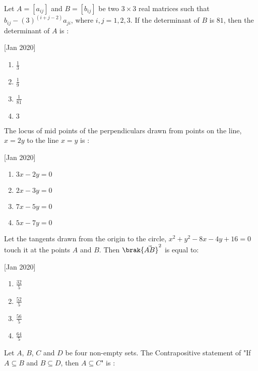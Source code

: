 \iffalse
\title{2020}
\author{EE24BTECH11019}
\section{mcq-single}
\fi

    \item Let $A=[a_{ij}]$ and $B=[b_{ij}]$ be two $3\times3$ real matrices such that $b_{ij}-(3)^{(i+j-2)}a_{ji}$, where $i,j=1,2,3$. If the determinant of $B$ is $81$, then the determinant of $A$ is :
    
    \hfill[Jan 2020]
        \begin{enumerate}
            \item $\frac{1}{3}$
            \item $\frac{1}{9}$
            \item $\frac{1}{81}$
            \item $3$
        \end{enumerate}

    \item The locus of mid points of the perpendiculars drawn from points on the line, $x=2y$ to the line $x=y$ is :
    
    \hfill[Jan 2020]
        \begin{enumerate}
            \item $3x-2y=0$
            \item $2x-3y=0$
            \item $7x-5y=0$
            \item $5x-7y=0$
        \end{enumerate}

    \item Let the tangents drawn from the origin to the circle, $x^2+y^2-8x-4y+16=0$ touch it at the points $A$ and $B$. Then $\brak{\vec{AB}}^2$ is equal to:
    
    \hfill[Jan 2020]
        \begin{enumerate}
            \item $\frac{32}{5}$
            \item $\frac{52}{5}$
            \item $\frac{56}{5}$
            \item $\frac{64}{5}$
        \end{enumerate}

    \item Let $A$, $B$, $C$ and $D$ be four non-empty sets. The Contrapositive statement of "If $A \subseteq B$ and $B \subseteq D$, then $A \subseteq C$" is :
    
